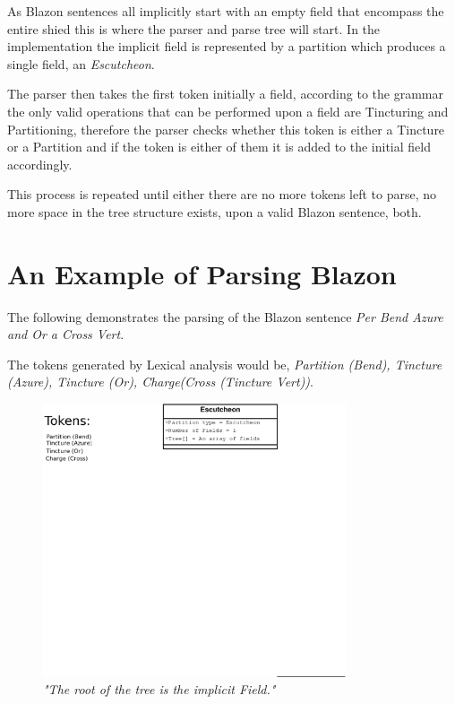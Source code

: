As Blazon sentences all implicitly start with an empty field that encompass the entire shied this is where the parser and parse tree will start.  In the implementation the implicit field is represented by a partition which produces a single field,  an \emph{Escutcheon}. 

The parser then takes the first token initially a field, according to the grammar the only valid operations that can be performed upon a field are Tincturing and Partitioning, therefore the parser checks whether this token is either a Tincture or a Partition and if the token is either of them it is added to the initial field accordingly.  

This process is repeated until either there are no more tokens left to parse, no more space in the tree structure exists, upon a valid Blazon sentence, both. 



\section{An Example of Parsing Blazon}


The following demonstrates the parsing of the Blazon sentence \emph{Per Bend Azure and Or a Cross Vert}.  

The tokens generated by Lexical analysis would be, \emph{Partition (Bend), Tincture (Azure), Tincture (Or), Charge(Cross (Tincture Vert))}.


\begin{figure}[H]
  \centering
    \includegraphics[width=0.8\textwidth]{parsing/images/Parsing5.eps}
  \caption{\emph{"The root of the tree is the implicit Field."}}
  
\end{figure}


